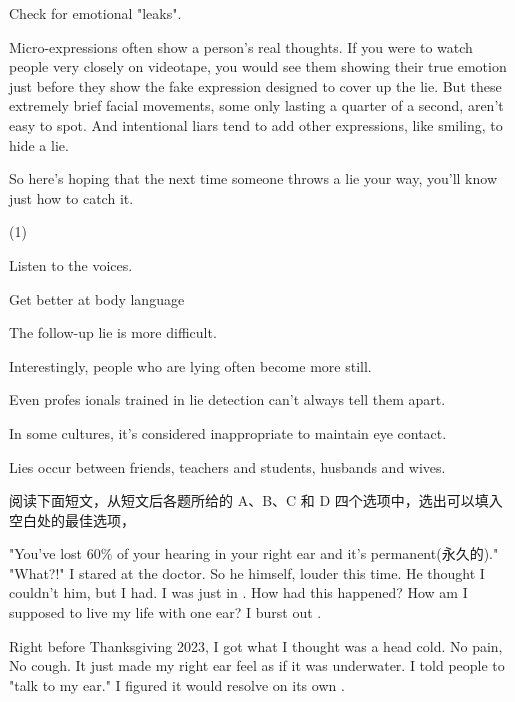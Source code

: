 \documentclass{英语试卷}
\begin{document}
\par Check for emotional "leaks".\par
\par Micro-expressions often show a person's real thoughts. If you were to watch people very closely on videotape, you would see them showing their true emotion just before they show the fake expression designed to cover up the lie. But these extremely brief facial movements, some only lasting a quarter of a second, aren't easy to spot.  And intentional liars tend to add other expressions, like smiling, to hide a lie.\par
\par So here's hoping that the next time someone throws a lie your way, you'll know just how to catch it.\par
\begin{choices}(1)
  \item Listen to the voices.
  \item Get better at body language
  \item The follow-up lie is more difficult.
  \item Interestingly, people who are lying often become more still.
  \item Even profes ionals trained in lie detection can't always tell them apart.
  \item In some cultures, it's considered inappropriate to maintain eye contact.
  \item Lies occur between friends, teachers and students, husbands and wives.
\end{choices}
\par 阅读下面短文，从短文后各题所给的 A、B、C 和 D 四个选项中，选出可以填入空白处的最佳选项，\par
\par "You’ve lost 60\% of your hearing in your right ear and it's permanent(永久的)." "What?!" I stared at the doctor. So he  himself, louder this time. He thought I couldn't  him, but I had. I was just in . How had this happened? How am I supposed to live my life with one ear? I burst out .\par
\par Right before Thanksgiving 2023, I got what I thought was a  head cold. No pain, No cough. It just made my right ear feel as if it was underwater. I told people to "talk to my  ear." I figured it would resolve on its own .\par
\end{document}
